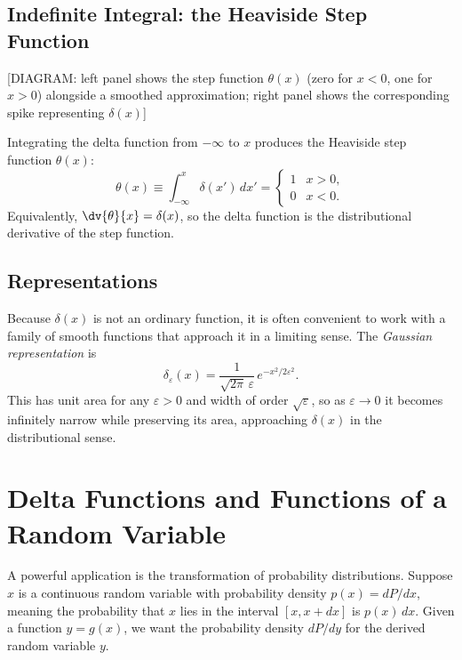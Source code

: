 \subsection{Indefinite Integral: the Heaviside Step Function}

\begin{center}[DIAGRAM: left panel shows the step function $\theta(x)$ (zero for $x<0$, one for $x>0$) alongside a smoothed approximation; right panel shows the corresponding spike representing $\delta(x)$]\end{center}

Integrating the delta function from $-\infty$ to $x$ produces the Heaviside step function $\theta(x)$:
\begin{equation}
    \theta(x) \equiv \int_{-\infty}^{x} \delta(x')\,dx' =
    \begin{cases} 1 & x > 0, \\ 0 & x < 0. \end{cases}
\end{equation}
Equivalently, $\dv{\theta}{x} = \delta(x)$, so the delta function is the distributional derivative of the step function.

\subsection{Representations}

Because $\delta(x)$ is not an ordinary function, it is often convenient to work with a family of smooth functions that approach it in a limiting sense. The \emph{Gaussian representation} is
\begin{equation}
    \delta_\varepsilon(x) = \frac{1}{\sqrt{2\pi}\,\varepsilon}\,e^{-x^2/2\varepsilon^2}.
\end{equation}
This has unit area for any $\varepsilon > 0$ and width of order $\sqrt{\varepsilon}$, so as $\varepsilon \to 0$ it becomes infinitely narrow while preserving its area, approaching $\delta(x)$ in the distributional sense.

\section{Delta Functions and Functions of a Random Variable}

A powerful application is the transformation of probability distributions. Suppose $x$ is a continuous random variable with probability density $p(x) = dP/dx$, meaning the probability that $x$ lies in the interval $[x, x+dx]$ is $p(x)\,dx$. Given a function $y = g(x)$, we want the probability density $dP/dy$ for the derived random variable $y$.

